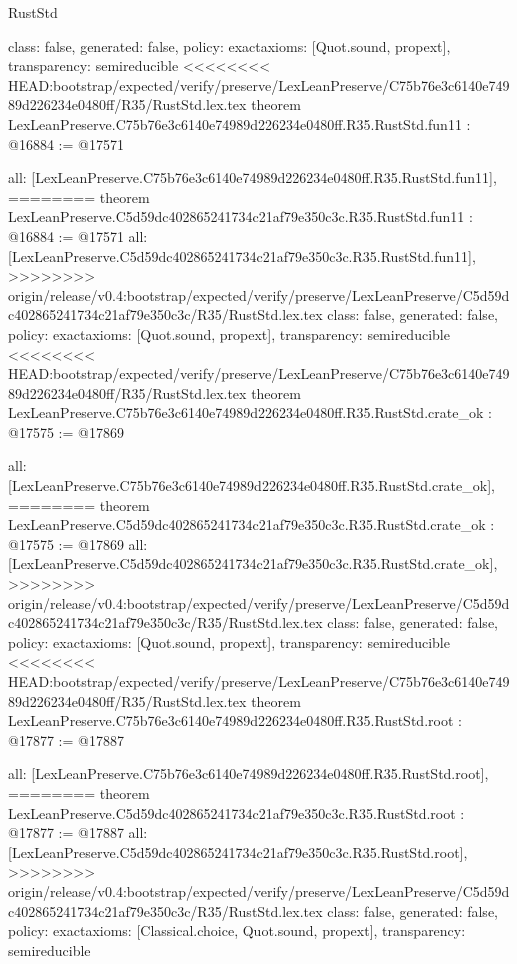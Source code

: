 \begin{lexlean}{RustStd}
\begin{coremodule}
{\begin{coremodule}
{{{{{{{{{{{{{{  class: false,
  generated: false,
  policy: exact{axioms: [Quot.sound, propext]},
  transparency: semireducible
}
<<<<<<<< HEAD:bootstrap/expected/verify/preserve/LexLeanPreserve/C75b76e3c6140e74989d226234e0480ff/R35/RustStd.lex.tex
theorem LexLeanPreserve.C75b76e3c6140e74989d226234e0480ff.R35.RustStd.fun11 : @16884 := @17571 {
  all: [LexLeanPreserve.C75b76e3c6140e74989d226234e0480ff.R35.RustStd.fun11],
========
theorem LexLeanPreserve.C5d59dc402865241734c21af79e350c3c.R35.RustStd.fun11 : @16884 := @17571 {
  all: [LexLeanPreserve.C5d59dc402865241734c21af79e350c3c.R35.RustStd.fun11],
>>>>>>>> origin/release/v0.4:bootstrap/expected/verify/preserve/LexLeanPreserve/C5d59dc402865241734c21af79e350c3c/R35/RustStd.lex.tex
  class: false,
  generated: false,
  policy: exact{axioms: [Quot.sound, propext]},
  transparency: semireducible
}
<<<<<<<< HEAD:bootstrap/expected/verify/preserve/LexLeanPreserve/C75b76e3c6140e74989d226234e0480ff/R35/RustStd.lex.tex
theorem LexLeanPreserve.C75b76e3c6140e74989d226234e0480ff.R35.RustStd.crate_ok : @17575 := @17869 {
  all: [LexLeanPreserve.C75b76e3c6140e74989d226234e0480ff.R35.RustStd.crate_ok],
========
theorem LexLeanPreserve.C5d59dc402865241734c21af79e350c3c.R35.RustStd.crate_ok : @17575 := @17869 {
  all: [LexLeanPreserve.C5d59dc402865241734c21af79e350c3c.R35.RustStd.crate_ok],
>>>>>>>> origin/release/v0.4:bootstrap/expected/verify/preserve/LexLeanPreserve/C5d59dc402865241734c21af79e350c3c/R35/RustStd.lex.tex
  class: false,
  generated: false,
  policy: exact{axioms: [Quot.sound, propext]},
  transparency: semireducible
}
<<<<<<<< HEAD:bootstrap/expected/verify/preserve/LexLeanPreserve/C75b76e3c6140e74989d226234e0480ff/R35/RustStd.lex.tex
theorem LexLeanPreserve.C75b76e3c6140e74989d226234e0480ff.R35.RustStd.root : @17877 := @17887 {
  all: [LexLeanPreserve.C75b76e3c6140e74989d226234e0480ff.R35.RustStd.root],
========
theorem LexLeanPreserve.C5d59dc402865241734c21af79e350c3c.R35.RustStd.root : @17877 := @17887 {
  all: [LexLeanPreserve.C5d59dc402865241734c21af79e350c3c.R35.RustStd.root],
>>>>>>>> origin/release/v0.4:bootstrap/expected/verify/preserve/LexLeanPreserve/C5d59dc402865241734c21af79e350c3c/R35/RustStd.lex.tex
  class: false,
  generated: false,
  policy: exact{axioms: [Classical.choice, Quot.sound, propext]},
  transparency: semireducible
}

}}}}}}}}}}}}}}}}
\end{coremodule}}
\end{coremodule}
\end{lexlean}
